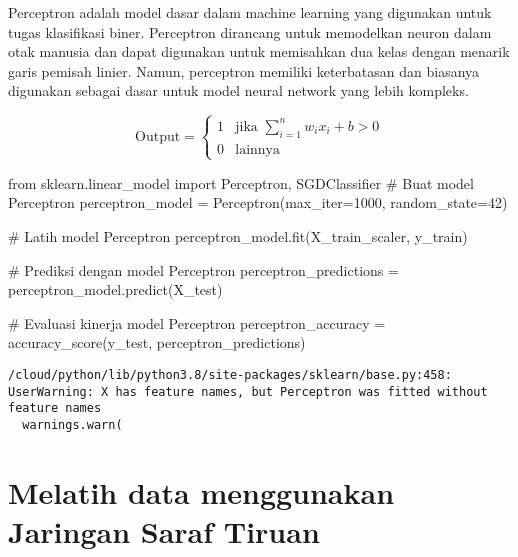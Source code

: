\documentclass[
  letterpaper,
]{krantz}
\makeatletter
\newenvironment{Shaded}{\begin{snugshade}}{\end{snugshade}}
\newcommand{\CommentTok}[1]{\textcolor[rgb]{0.37,0.37,0.37}{#1}}
\newcommand{\DecValTok}[1]{\textcolor[rgb]{0.68,0.00,0.00}{#1}}
\newcommand{\ImportTok}[1]{\textcolor[rgb]{0.00,0.46,0.62}{#1}}
\newcommand{\NormalTok}[1]{\textcolor[rgb]{0.00,0.23,0.31}{#1}}
\newcommand{\OperatorTok}[1]{\textcolor[rgb]{0.37,0.37,0.37}{#1}}
\newenvironment{kframe}{%
\medskip{}
\setlength{\fboxsep}{.8em}
 \def\at@end@of@kframe{}%
 \ifinner\ifhmode%
  \def\at@end@of@kframe{\end{minipage}}%
  \begin{minipage}{\columnwidth}%
 \fi\fi%
 \def\FrameCommand##1{\hskip\@totalleftmargin \hskip-\fboxsep
 \colorbox{shadecolor}{##1}\hskip-\fboxsep
     \hskip-\linewidth \hskip-\@totalleftmargin \hskip\columnwidth}%
 \MakeFramed {\advance\hsize-\width
   \@totalleftmargin\z@ \linewidth\hsize
   \@setminipage}}%
 {\par\unskip\endMakeFramed%
 \at@end@of@kframe}
\renewenvironment{Shaded}{\begin{kframe}}{\end{kframe}}
\makeatother
\begin{document}

Perceptron adalah model dasar dalam machine learning yang digunakan
untuk tugas klasifikasi biner. Perceptron dirancang untuk memodelkan
neuron dalam otak manusia dan dapat digunakan untuk memisahkan dua kelas
dengan menarik garis pemisah linier. Namun, perceptron memiliki
keterbatasan dan biasanya digunakan sebagai dasar untuk model neural
network yang lebih kompleks.

\[
\text{Output} = \begin{cases} 
1 & \text{jika } \sum_{i=1}^{n} w_i x_i + b > 0 \\
0 & \text{lainnya}
\end{cases}
\]

\begin{Shaded}
\begin{Highlighting}[]
\ImportTok{from}\NormalTok{ sklearn.linear\_model }\ImportTok{import}\NormalTok{ Perceptron, SGDClassifier}
\CommentTok{\# Buat model Perceptron}
\NormalTok{perceptron\_model }\OperatorTok{=}\NormalTok{ Perceptron(max\_iter}\OperatorTok{=}\DecValTok{1000}\NormalTok{, random\_state}\OperatorTok{=}\DecValTok{42}\NormalTok{)}

\CommentTok{\# Latih model Perceptron}
\NormalTok{perceptron\_model.fit(X\_train\_scaler, y\_train)}

\CommentTok{\# Prediksi dengan model Perceptron}
\NormalTok{perceptron\_predictions }\OperatorTok{=}\NormalTok{ perceptron\_model.predict(X\_test)}

\CommentTok{\# Evaluasi kinerja model Perceptron}
\NormalTok{perceptron\_accuracy }\OperatorTok{=}\NormalTok{ accuracy\_score(y\_test, perceptron\_predictions)}
\end{Highlighting}
\end{Shaded}

\begin{verbatim}
/cloud/python/lib/python3.8/site-packages/sklearn/base.py:458: UserWarning: X has feature names, but Perceptron was fitted without feature names
  warnings.warn(
\end{verbatim}

\hypertarget{melatih-data-menggunakan-jaringan-saraf-tiruan}{%
\section*{Melatih data menggunakan Jaringan Saraf
Tiruan}\label{melatih-data-menggunakan-jaringan-saraf-tiruan}}
\end{document}
